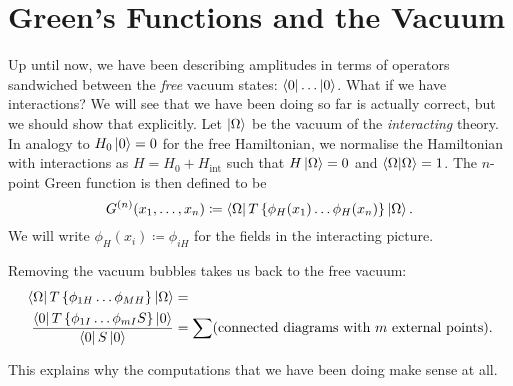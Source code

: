 \section{Green's Functions and the Vacuum}%
\label{sec:green_s_functions_and_the_vacuum}

Up until now, we have been describing amplitudes in terms of operators sandwiched between the \emph{free} vacuum states: $\bra{0} \dots \ket{0}$.
What if we have interactions? We will see that we have been doing so far is actually correct, but we should show that explicitly.
Let $\ket{\Omega}$ be the vacuum of the \emph{interacting} theory.
In analogy to $H_0 \ket{0} = 0$ for the free Hamiltonian, we normalise the Hamiltonian with interactions as $H = H_0 + H_{\text{int}}$ such that $H \ket{\Omega}= 0$ and $\bra{\Omega}\ket{\Omega} = 1$.
The $n$-point Green function is then defined to be
\begin{equation}
  G^{(n)} (x_1, \dots, x_n) \coloneqq \bra{\Omega} T \left\{ \phi_H (x_1) \dots \phi_H(x_n) \right\} \ket{\Omega}.
\end{equation}
We will write $\phi_H(x_i) \coloneqq \phi_{iH}$ for the fields in the interacting picture.
\begin{claim}
  Removing the vacuum bubbles takes us back to the free vacuum:
  \begin{align}
    \bra{\Omega} T \left\{ \phi_{1H} \dots \phi_{M H} \right\} \ket{\Omega} &=  \\
    \frac{\bra{0} T \left\{ \phi_{1I} \dots \phi_{mI}S \right\}\ket{0}}{\bra{0}S \ket{0}}
									    &= \sum (\text{connected diagrams with $m$ external points}).
  \end{align}
\end{claim}
\begin{leftbar}
  \begin{remark}
    This explains why the computations that we have been doing make sense at all.
  \end{remark}
\end{leftbar}
